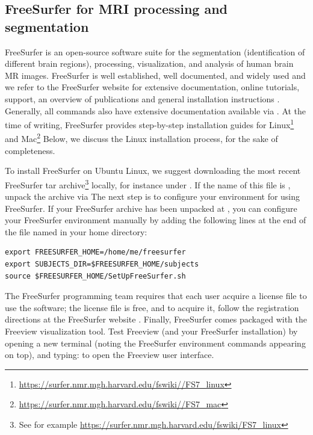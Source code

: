\subsection{FreeSurfer for MRI processing and segmentation}
\label{sec:chp2:tools:freesurfer}

FreeSurfer \cite{dale1999cortical} is an open-source software suite
for the segmentation (identification of different brain regions), processing,
visualization, and analysis of human brain MR images. FreeSurfer is
well established, well documented, and widely used and we refer to the
FreeSurfer website for extensive documentation, online tutorials,
support, an overview of publications and general installation
instructions \cite{freesurfer}. Generally, all \freesurfer{} commands
also have extensive documentation available via . At the time of 
writing, FreeSurfer provides step-by-step installation guides for 
Linux\footnote{\url{https://surfer.nmr.mgh.harvard.edu/fswiki//FS7\_linux}}
and Mac\footnote{\url{https://surfer.nmr.mgh.harvard.edu/fswiki//FS7\_mac}} 
Below, we discuss the Linux installation process, for the sake of completeness. 

To install FreeSurfer on Ubuntu Linux, we suggest downloading the most
recent FreeSurfer tar archive\footnote{See for example
  \url{https://surfer.nmr.mgh.harvard.edu/fswiki/FS7\_linux}} locally,
for instance under . If the name of this file
is , unpack the archive via 
\noindent The next step is to configure your environment for using
FreeSurfer. If your FreeSurfer archive has been unpacked at
, you can configure your FreeSurfer
environment manually by adding the following lines at the end of the
file named  in your home directory:
\begin{lstlisting}[style=bashStyle]
export FREESURFER_HOME=/home/me/freesurfer 
export SUBJECTS_DIR=$FREESURFER_HOME/subjects 
source $FREESURFER_HOME/SetUpFreeSurfer.sh
\end{lstlisting}
  


\noindent The {FreeSurfer} programming team requires that each user
acquire a license file to use the software; the license file is free,
and to acquire it, follow the registration directions at the FreeSurfer
website \cite{freesurfer}. Finally, FreeSurfer comes packaged
with the Freeview visualization tool. Test Freeview (and your
FreeSurfer installation) by opening a new terminal (noting the
FreeSurfer environment commands appearing on top), and typing:
\noindent to open the Freeview user interface.

